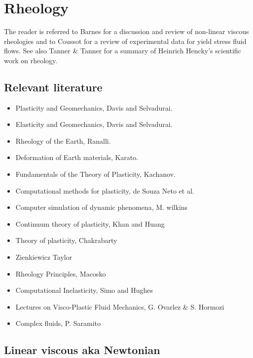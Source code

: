 \chapter{Rheology}

The reader is referred to Barnes \cite{barn99}
for a discussion and review of non-linear viscous rheologies and 
to Coussot \cite{cous14} for a review of experimental data for yield stress fluid
flows. See also Tanner \& Tanner \cite{tata03} for a summary of Heinrich Hencky's 
scientific work on rheology. 

\section{Relevant literature}

\begin{itemize}
\item Plasticity and Geomechanics, Davis and Selvadurai. \cite{dase02}
\item Elasticity and Geomechanics, Davis and Selvadurai. \cite{dase96}
\item Rheology of the Earth, Ranalli. \cite{ranalli}
\item Deformation of Earth materials, Karato. \cite{kara08}
\item Fundamentals of the Theory of Plasticity, Kachanov. \cite{kacha04} 
\item Computational methods for plasticity, de Souza Neto et al. \cite{depo}
\item Computer simulation of dynamic phenomena, M. wilkins \cite{wilk}
\item Continuum theory of plasticity, Khan and Huang \cite{khhu}
\item Theory of plasticity, Chakrabarty \cite{chakrabarty}
\item Zienkiewicz Taylor \cite{zita2}
\item Rheology Principles, Macosko \cite{macosko}
\item Computational Inelasticity, Simo and Hughes \cite{simohughes} 
\item Lectures on Visco-Plastic Fluid Mechanics, G. Ovarlez \& S. Hormozi \cite{ovho19}
\item Complex fluids, P. Saramito \cite{saramito}
\end{itemize}



\section{Linear viscous aka Newtonian} 


